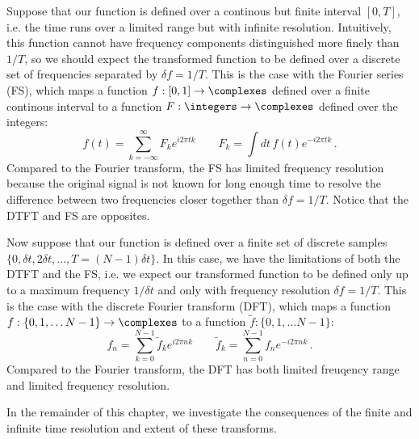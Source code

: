 Suppose that our function is defined over a continous but finite interval $[0, T]$, i.e. the time runs over a limited range but with infinite resolution.
Intuitively, this function cannot have frequency components distinguished more finely than $1/T$, so we should expect the transformed function to be defined over a discrete set of frequencies separated by $\delta f = 1 / T$.
This is the case with the Fourier series (FS), which maps a function $f: [0, 1] \rightarrow \complexes$ defined over a finite continous interval to a function $F: \integers \rightarrow \complexes$ defined over the integers:
\begin{equation}
  f(t) = \sum_{k=-\infty}^\infty F_k e^{i 2 \pi t k}
  \qquad
  F_k = \int dt \, f(t) e^{-i 2 \pi t k}
  \, .
\end{equation}
Compared to the Fourier transform, the FS has limited frequency resolution because the original signal is not known for long enough time to resolve the difference between two frequencies closer together than $\delta f = 1 / T$.
Notice that the DTFT and FS are opposites.

Now suppose that our function is defined over a finite set of discrete samples $\{0, \delta t, 2 \delta t,\ldots, T = (N-1) \delta t\}$.
In this case, we have the limitations of both the DTFT and the FS, i.e. we expect our transformed function to be defined only up to a maximum frequency $1 / \delta t$ and only with frequency resolution $\delta f = 1 / T$.
This is the case with the discrete Fourier transform (DFT), which maps a function $f: \{0, 1,\ldots N-1\} \rightarrow \complexes$ to a function $\tilde f: \{0, 1,\ldots N-1\}$:
\begin{equation}
  f_n = \sum_{k=0}^{N-1} \tilde{f}_k e^{i 2 \pi n k}
  \qquad
  \tilde{f}_k = \sum_{n=0}^{N-1} f_n e^{-i 2 \pi n k}
  \, .
\end{equation}
Compared to the Fourier transform, the DFT has both limited freuqency range and limited frequency resolution.


In the remainder of this chapter, we investigate the consequences of the finite and infinite time resolution and extent of these transforms.
